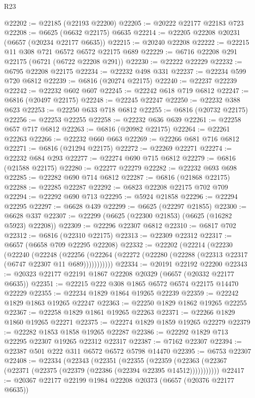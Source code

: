 \begin{lexlean}{R23}
\begin{coremodule}
@22202 := @22185 (@22193 @22200)
@22205 := @20222 @22177 @22183 @723
@22208 := @6625 (@6632 @22175) @6635
@22214 := @22205 @22208 @20231 (@6657 (@20234 @22177 @6635))
@22215 := @20240 @22208
@22222 := @22215 @11 @308 @721 @6572 @6572 @22175 @689
@22229 := @6716 @22208 @291 @22175 (@6721 (@6722 @22208 @291))
@22230 := @22222 @22229
@22232 := @6795 @22208 @22175
@22234 := @22232 @498 @331
@22237 := @22234 @599 @720 @6812
@22239 := @6816 (@20274 @22175)
@22240 := @22237 @22239
@22242 := @22232 @602 @607
@22245 := @22242 @618 @719 @6812
@22247 := @6816 (@20497 @22175)
@22248 := @22245 @22247
@22250 := @22232 @388 @623
@22253 := @22250 @633 @718 @6812
@22255 := @6816 (@20732 @22175)
@22256 := @22253 @22255
@22258 := @22232 @636 @639
@22261 := @22258 @657 @717 @6812
@22263 := @6816 (@20982 @22175)
@22264 := @22261 @22263
@22266 := @22232 @660 @663
@22269 := @22266 @681 @716 @6812
@22271 := @6816 (@21294 @22175)
@22272 := @22269 @22271
@22274 := @22232 @684 @293
@22277 := @22274 @690 @715 @6812
@22279 := @6816 (@21588 @22175)
@22280 := @22277 @22279
@22282 := @22232 @693 @698
@22285 := @22282 @690 @714 @6812
@22287 := @6816 (@21868 @22175)
@22288 := @22285 @22287
@22292 := @6823 @22208 @22175 @702 @709
@22294 := @22292 @690 @713
@22295 := @5924 @21858
@22296 := @22294 @22295
@22297 := @6628 @439
@22299 := @6625 (@22297 @21855)
@22300 := @6628 @337
@22307 := @22299 (@6625 (@22300 @21853) (@6625 (@16282 @5923) @22208))
@22309 := @22296 @22307 @6812
@22310 := @6817 @702
@22312 := @6816 (@22310 @22175)
@22313 := @22309 @22312
@22317 := @6657 (@6658 @709 @22295 @22208)
@22332 := @22202
    (@22214
      (@22230
        (@22240
          (@22248
            (@22256 (@22264 (@22272 (@22280 (@22288 (@22313 @22317 (@6747 @22307 @11 @689)))))))))))
@22334 := @20191 @22192 @22200
@22343 := @20323 @22177 @22191 @1867 @22208 @20329 (@6657 (@20332 @22177 @6635))
@22351 := @22215 @222 @308 @1865 @6572 @6574 @22175 @14470 @22229
@22355 := @22234 @1829 @1864 @19265 @22239
@22359 := @22242 @1829 @1863 @19265 @22247
@22363 := @22250 @1829 @1862 @19265 @22255
@22367 := @22258 @1829 @1861 @19265 @22263
@22371 := @22266 @1829 @1860 @19265 @22271
@22375 := @22274 @1829 @1859 @19265 @22279
@22379 := @22282 @1853 @1858 @19265 @22287
@22386 := @22292 @1829 @713 @22295 @22307 @19265 @22312 @22317
@22387 := @7162 @22307
@22394 := @22387 @501 @222 @311 @6572 @6572 @5798 @14470
@22395 := @6753 @22307
@22408 := @22334
    (@22343
      (@22351
        (@22355
          (@22359 (@22363 (@22367 (@22371 (@22375 (@22379 (@22386 (@22394 @22395 @14512)))))))))))
@22417 := @20367 @22177 @22199 @1984 @22208 @20373 (@6657 (@20376 @22177 @6635))

\end{coremodule}
\end{lexlean}
